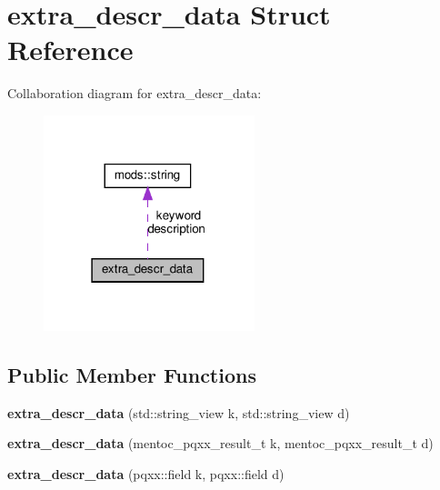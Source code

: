 \hypertarget{structextra__descr__data}{}\section{extra\+\_\+descr\+\_\+data Struct Reference}
\label{structextra__descr__data}


Collaboration diagram for extra\+\_\+descr\+\_\+data\+:\nopagebreak
\begin{figure}[H]
\begin{center}
\leavevmode
\includegraphics[width=174pt]{structextra__descr__data__coll__graph}
\end{center}
\end{figure}
\subsection*{Public Member Functions}
\begin{DoxyCompactItemize}
\item 
\mbox{\label{structextra__descr__data_aee3a0db7a8998d8cce2e96477b3c29e5}} 
{\bfseries extra\+\_\+descr\+\_\+data} (std\+::string\+\_\+view k, std\+::string\+\_\+view d)
\item 
\mbox{\label{structextra__descr__data_ac51e1a1443cfe4be5482da478b5f20b8}} 
{\bfseries extra\+\_\+descr\+\_\+data} (mentoc\+\_\+pqxx\+\_\+result\+\_\+t k, mentoc\+\_\+pqxx\+\_\+result\+\_\+t d)
\item 
\mbox{\label{structextra__descr__data_a0796320be1877f9398a20495f782a1db}} 
{\bfseries extra\+\_\+descr\+\_\+data} (pqxx\+::field k, pqxx\+::field d)
\end{DoxyCompactItemize}
